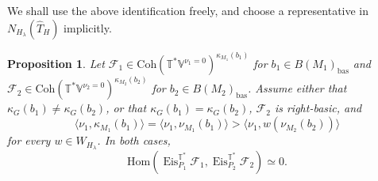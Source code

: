 \documentclass{amsart}
\newtheorem{proposition}[theorem]{Proposition}
\theoremstyle{definition}
\theoremstyle{remark}
\numberwithin{equation}{section}
\newcommand{\mc}{\mathcal}
\newcommand{\bas}{\mathrm{bas}}
\newcommand{\Hom}{\mathrm{Hom}}
\newcommand{\wh}{\widehat}
\DeclareMathOperator{\Eis}{\mathrm{Eis}}
\newcommand{\Coh}{\mathrm{Coh}}
\newcommand{\V}{\mathbb{V}}
\newcommand{\T}{\mathbb{T}}
\begin{document}
We shall use the above identification freely, and choose a representative in $N_{H_\lambda}(\wh T_H)$ implicitly. 

\begin{proposition}{\label{prop: generaleisbasisbas}}
Let $\mc F_1 \in \Coh(\T^{\ast}\V^{\nu_1=0})^{\kappa_{M_1}(b_1)}$ for $b_1 \in B(M_1)_{\bas}$ and $\mc F_2 \in \Coh(\T^* \V^{\nu_2=0})^{\kappa_{M_2}(b_{2})}$ for $b_{2} \in B(M_2)_{\bas}$. Assume either that $\kappa_G(b_1)\neq \kappa_G(b_2)$, or that $\kappa_G(b_1)=\kappa_G(b_2)$, $\mc F_2$ is right-basic, and
\[
\langle \nu_1,\kappa_{M_1}(b_{1})\rangle=\langle \nu_1,\nu_{M_1}(b_1)\rangle
> \langle \nu_1,w(\nu_{M_2}(b_2))\rangle
\]
for every $w\in W_{H_\lambda}$. In both cases, 
\[
\Hom (\Eis^{\T^{\ast}}_{P_1} \mc F_1, \Eis^{\T^{\ast}}_{P_2} \mc F_2)\simeq 0. 
\]
\end{proposition}
\end{document}
